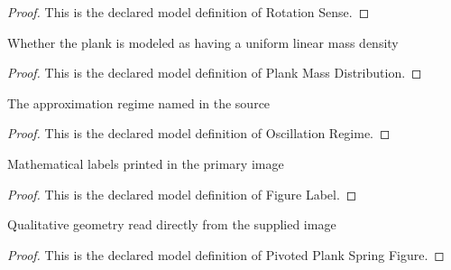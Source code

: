 \begin{proof}
  This is the declared model definition of Rotation Sense.
\end{proof}
\begin{definition}
  \label{def:physics:phyx-mini-0232:phyxminiproblems-problemphyxmini0232-plankmassdistribution}
  Whether the plank is modeled as having a uniform linear mass density
\end{definition}
\begin{proof}
  This is the declared model definition of Plank Mass Distribution.
\end{proof}
\begin{definition}
  \label{def:physics:phyx-mini-0232:phyxminiproblems-problemphyxmini0232-oscillationregime}
  The approximation regime named in the source
\end{definition}
\begin{proof}
  This is the declared model definition of Oscillation Regime.
\end{proof}
\begin{definition}
  \label{def:physics:phyx-mini-0232:phyxminiproblems-problemphyxmini0232-figurelabel}
  Mathematical labels printed in the primary image
\end{definition}
\begin{proof}
  This is the declared model definition of Figure Label.
\end{proof}
\begin{definition}
  \label{def:physics:phyx-mini-0232:phyxminiproblems-problemphyxmini0232-pivotedplankspringfigure}
  Qualitative geometry read directly from the supplied image
\end{definition}
\begin{proof}
  This is the declared model definition of Pivoted Plank Spring Figure.
\end{proof}
